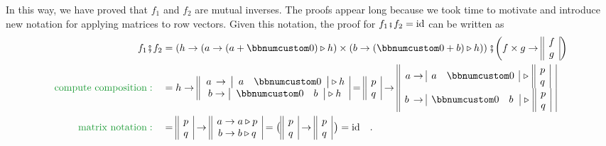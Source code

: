 In this way, we have proved that $f_{1}$ and $f_{2}$ are mutual
inverses. The proofs appear long because we took time to motivate
and introduce new notation for applying matrices to row vectors. Given
this notation, the proof for $f_{1}\bef f_{2}=\text{id}$ can be written
as
\begin{align*}
f_{1}\bef f_{2} & =\left(h\rightarrow(a\rightarrow(a+\bbnum 0)\triangleright h)\times(b\rightarrow(\bbnum 0+b)\triangleright h)\right)\bef\bigg(f\times g\rightarrow\begin{array}{||c|}
f\\
g
\end{array}\bigg)\\
{\color{greenunder}\text{compute composition}:}\quad & =h\rightarrow\begin{array}{||c|}
\,a\,\rightarrow\,\left|\begin{array}{cc}
a & \bbnum 0\end{array}\right|\triangleright h\\
b\rightarrow\left|\begin{array}{cc}
\bbnum 0 & b\end{array}\right|\triangleright h
\end{array}=\begin{array}{||c|}
p\\
q
\end{array}\rightarrow\begin{array}{||c|}
a\rightarrow\begin{array}{|cc|}
a & \bbnum 0\end{array}\,\triangleright\,\begin{array}{||c|}
p\\
q
\end{array}\\
b\,\rightarrow\begin{array}{|cc|}
\bbnum 0 & b\,\end{array}\,\triangleright\,\begin{array}{||c|}
p\\
q
\end{array}
\end{array}\\
{\color{greenunder}\text{matrix notation}:}\quad & =\begin{array}{||c|}
p\\
q
\end{array}\rightarrow\begin{array}{||c|}
a\rightarrow a\triangleright p\\
b\rightarrow b\triangleright q
\end{array}=\big(\begin{array}{||c|}
p\\
q
\end{array}\rightarrow\begin{array}{||c|}
p\\
q
\end{array}\,\big)=\text{id}\quad.
\end{align*}
